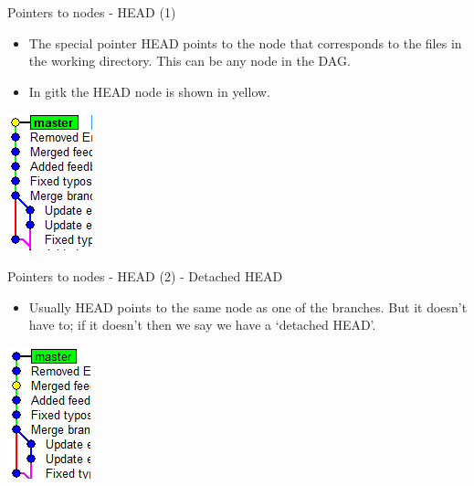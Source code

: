 \documentclass[usenames,dvipsnames]{beamer}
\begin{document}
\begin{frame}{Pointers to nodes - HEAD (1)}
  \begin{block}{}
    \begin{itemize}
      \item{The special pointer HEAD points to the node that corresponds to the files in the working directory. This can be any node in the DAG.}
      \item{In gitk the HEAD node is shown in yellow.}
    \end{itemize}
  \end{block}
  \begin{block}{}
    \begin{center}
      \includegraphics[scale=0.8]{Head.png}
    \end{center}
  \end{block}
\end{frame}

\begin{frame}{Pointers to nodes - HEAD (2) - Detached HEAD}
  \begin{block}{}
    \begin{itemize}
      \item{Usually HEAD points to the same node as one of the branches. But it doesn't have to; if it doesn't then we say we have a `detached HEAD'.}
    \end{itemize}
  \end{block}
  \begin{block}{}
    \begin{center}
      \includegraphics[scale=0.8]{DetachedHead.png}
    \end{center}
  \end{block}
\end{frame}
\end{document}
